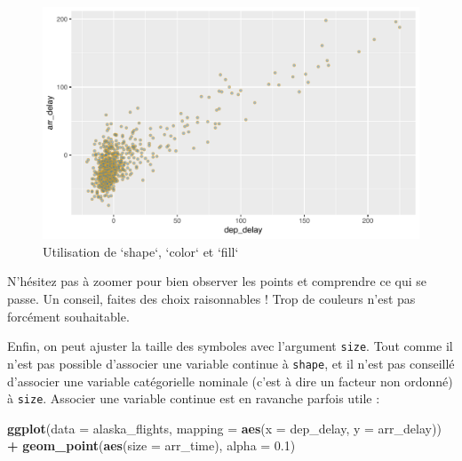 \documentclass[a4paperpaper,]{article}
\newenvironment{Shaded}{\begin{snugshade}}{\end{snugshade}}
\newcommand{\KeywordTok}[1]{\textcolor[rgb]{0.13,0.29,0.53}{\textbf{#1}}}
\newcommand{\DataTypeTok}[1]{\textcolor[rgb]{0.13,0.29,0.53}{#1}}
\newcommand{\FloatTok}[1]{\textcolor[rgb]{0.00,0.00,0.81}{#1}}
\newcommand{\StringTok}[1]{\textcolor[rgb]{0.31,0.60,0.02}{#1}}
\newcommand{\OperatorTok}[1]{\textcolor[rgb]{0.81,0.36,0.00}{\textbf{#1}}}
\newcommand{\NormalTok}[1]{#1}
\theoremstyle{definition}
\theoremstyle{definition}
\theoremstyle{definition}
\theoremstyle{remark}
\begin{document}
\begin{figure}[htpb]

{\centering \includegraphics[width=0.9\linewidth]{figure/shapecolorplot-1} 

}

\caption{Utilisation de `shape`, `color` et `fill`}\label{fig:shapecolorplot}
\end{figure}

N'hésitez pas à zoomer pour bien observer les points et comprendre ce
qui se passe. Un conseil, faites des choix raisonnables ! Trop de
couleurs n'est pas forcément souhaitable.

Enfin, on peut ajuster la taille des symboles avec l'argument
\texttt{size}. Tout comme il n'est pas possible d'associer une variable
continue à \texttt{shape}, et il n'est pas conseillé d'associer une
variable catégorielle nominale (c'est à dire un facteur non ordonné) à
\texttt{size}. Associer une variable continue est en ravanche parfois
utile :

\begin{Shaded}
\begin{Highlighting}[]
\KeywordTok{ggplot}\NormalTok{(}\DataTypeTok{data =}\NormalTok{ alaska_flights, }\DataTypeTok{mapping =} \KeywordTok{aes}\NormalTok{(}\DataTypeTok{x =}\NormalTok{ dep_delay, }\DataTypeTok{y =}\NormalTok{ arr_delay)) }\OperatorTok{+}
\StringTok{  }\KeywordTok{geom_point}\NormalTok{(}\KeywordTok{aes}\NormalTok{(}\DataTypeTok{size =}\NormalTok{ arr_time), }\DataTypeTok{alpha =} \FloatTok{0.1}\NormalTok{)}
\end{Highlighting}
\end{Shaded}
\end{document}
